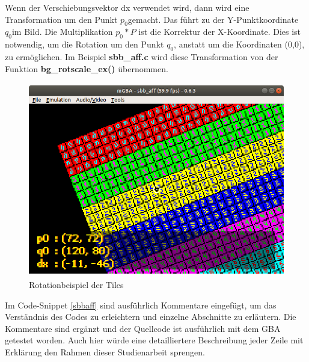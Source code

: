 Wenn der Verschiebungsvektor dx verwendet wird, dann wird eine Transformation um den Punkt $p_{0}$gemacht. Das führt zu der Y-Punktkoordinate $q_{0}$im Bild. Die Multiplikation $p_{0}* P$ ist die Korrektur der X-Koordinate. Dies ist notwendig, um die Rotation um den Punkt $q_{0}$, anstatt um die Koordinaten (0,0), zu ermöglichen. Im Beispiel \textbf{sbb\_aff.c} wird diese Transformation von der Funktion \textbf{bg\_rotscale\_ex()} übernommen. \citep{matrixp}
\begin{figure}[H]
	\centering
	\includegraphics[height=85mm]{img/rotation.png}
	\caption{Rotationbeispiel der Tiles}
	\label{rotation}
\end{figure}

Im Code-Snippet \ref{sbbaff} sind ausführlich Kommentare eingefügt, um das Verständnis des Codes zu erleichtern und einzelne Abschnitte zu erläutern. Die Kommentare sind ergänzt und der Quellcode ist ausführlich mit dem \ac{GBA} getestet worden. Auch hier würde eine detailliertere Beschreibung jeder Zeile mit Erklärung den Rahmen dieser Studienarbeit sprengen.
 
